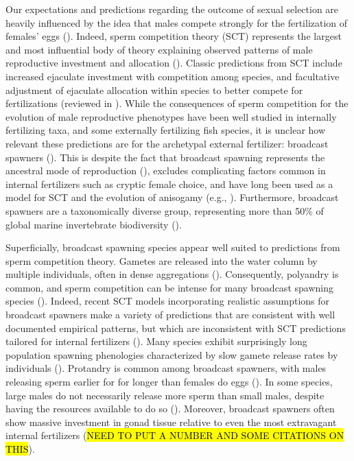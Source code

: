 \documentclass{article}
\begin{document}
Our expectations and predictions regarding the outcome of sexual selection are heavily influenced by the idea that males compete strongly for the fertilization of females' eggs (\citealt{Bateman1948, Parker1972, Parker1982}). Indeed, sperm competition theory (SCT) represents the largest and most influential body of theory explaining observed patterns of male reproductive investment and allocation (\citealt{Parker1972, Parker1982,Wedell2002}). Classic predictions from SCT include increased ejaculate investment with competition among species, and facultative adjustment of ejaculate allocation within species to better compete for fertilizations (reviewed in \citealt{Wedell2002}). While the consequences of sperm competition for the evolution of male reproductive phenotypes have been well studied in internally fertilizing taxa, and some externally fertilizing fish species, it is unclear how relevant these predictions are for the archetypal external fertilizer: broadcast spawners (\citealt{BodeMarshall2007, Olito2015}). This is despite the fact that broadcast spawning represents the ancestral mode of reproduction (\citealt{RouFitz1994}), excludes complicating factors common in internal fertilizers such as cryptic female choice, and have long been used as a model for SCT and the evolution of anisogamy (e.g., \citealt{Parker1972, Parker1982}). Furthermore, broadcast spawners are a taxonomically diverse group, representing more than 50\% of global marine invertebrate biodiversity (\citealt{MonroMarshall2015}).

Superficially, broadcast spawning species appear well suited to predictions from sperm competition theory. Gametes are released into the water column by multiple individuals, often in dense aggregations (\citealt{McEuan1988,Levitan1998,Levitan2002, Levitan2004, Marshall2002}). Consequently, polyandry is common, and sperm competition can be intense for many broadcast spawning species (\citealt{Levitan2002, Levitan2004}). Indeed, recent SCT models incorporating realistic assumptions for broadcast spawners make a variety of predictions that are consistent with well documented empirical patterns, but which are inconsistent with SCT predictions tailored for internal fertilizers (\citealt{BodeMarshall2007, Olito2015, Olito2017}). Many species exhibit surprisingly long population spawning phenologies characterized by slow gamete release rates by individuals (\citealt{McEuan1988,MarshallBolton2007}). Protandry is common among broadcast spawners, with males releasing sperm earlier for for longer than females do eggs (\citealt{McEuan1988, LotterhosLevitan2011, Levitan2005, MarshallBolton2007}). In some species, large males do not necessarily release more sperm than small males, despite having the resources available to do so (\citealt{Styan2003}). Moreover, broadcast spawners often show massive investment in gonad tissue relative to even the most extravagant internal fertilizers (\hl{NEED TO PUT A NUMBER AND SOME CITATIONS ON THIS}). 
\end{document}
